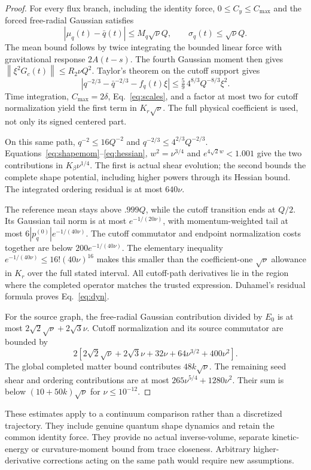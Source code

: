 \documentclass[11pt]{article}
\newcommand{\norm}[1]{\left\lVert#1\right\rVert}
\begin{document}
\begin{proof}
For every flux branch, including the identity force, $0\le C_y\le C_{\max}$ and the forced free-radial Gaussian satisfies
\[
 |\mu_q(t)-\bar q(t)|\le M_q\sqrt\nu Q,\qquad\sigma_q(t)\le\sqrt\nu Q.
\]
The mean bound follows by twice integrating the bounded linear force with gravitational response $2A(t-s)$.
The fourth Gaussian moment then gives $\norm{\xi^2G_c(t)}\le R_2\nu Q^2$.
Taylor's theorem on the cutoff support gives
\[
 |q^{-2/3}-\bar q^{-2/3}-f_q(t)\xi|
 \le\tfrac59\,4^{8/3}Q^{-8/3}\xi^2.
\]
Time integration, $C_{\max}=2\delta$, Eq.~\eqref{eq:scales}, and a factor at most two for cutoff normalization yield the first term in $K_r\sqrt\nu$.
The full physical coefficient is used, not only its signed centered part.

On this same path, $q^{-2}\le16Q^{-2}$ and $q^{-2/3}\le4^{2/3}Q^{-2/3}$.
Equations~\eqref{eq:shapemom}--\eqref{eq:hessian}, $w^2=\nu^{3/4}$ and $e^{4\sqrt2w}<1.001$ give the two contributions in $K_\beta\nu^{1/4}$.
The first is actual shear evolution; the second bounds the complete shape potential, including higher powers through its Hessian bound.
The integrated ordering residual is at most $640\nu$.

The reference mean stays above $.999Q$, while the cutoff transition ends at $Q/2$.
Its Gaussian tail norm is at most $e^{-1/(20\nu)}$, with momentum-weighted tail at most $6|p_q^{(0)}|e^{-1/(40\nu)}$.
The cutoff commutator and endpoint normalization costs together are below $200e^{-1/(40\nu)}$.
The elementary inequality $e^{-1/(40\nu)}\le16!(40\nu)^{16}$ makes this smaller than the coefficient-one $\sqrt\nu$ allowance in $K_r$ over the full stated interval.
All cutoff-path derivatives lie in the region where the completed operator matches the trusted expression.
Duhamel's residual formula proves Eq.~\eqref{eq:dyn}.

For the source graph, the free-radial Gaussian contribution divided by $E_0$ is at most $2\sqrt2\sqrt\nu+2\sqrt3\nu$.
Cutoff normalization and its source commutator are bounded by
\[
 2\left[2\sqrt2\sqrt\nu+2\sqrt3\nu
       +32\nu+64\nu^{3/2}+400\nu^2\right].
\]
The global completed matter bound contributes $48k\sqrt\nu$.
The remaining seed shear and ordering contributions are at most $265\nu^{5/4}+1280\nu^2$.
Their sum is below $(10+50k)\sqrt\nu$ for $\nu\le10^{-12}$.
\end{proof}

These estimates apply to a continuum comparison rather than a discretized trajectory.
They include genuine quantum shape dynamics and retain the common identity force.
They provide no actual inverse-volume, separate kinetic-energy or curvature-moment bound from trace closeness.
Arbitrary higher-derivative corrections acting on the same path would require new assumptions.
\end{document}
